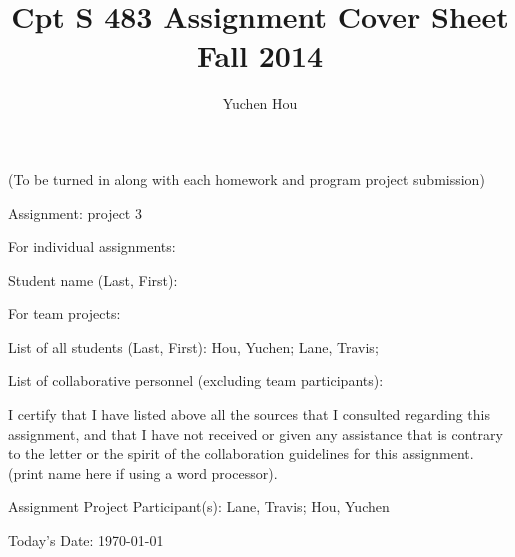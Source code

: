\documentclass[12pt]{article}
\begin{document}
\title{Cpt S 483 Assignment Cover Sheet \\ Fall 2014}
\author{Yuchen Hou}
\maketitle

(To be turned in along with each homework and program project submission)

Assignment: project 3

For individual assignments:

Student name (Last, First):

For team projects:

List of all students (Last, First): Hou, Yuchen; Lane, Travis;

List of collaborative personnel (excluding team participants):

I certify that I have listed above all the sources that I consulted regarding this assignment, and that I have not received or given any assistance that is contrary to the letter or the spirit of the collaboration guidelines for this assignment. (print name here if using a word processor).

Assignment Project Participant(s): Lane, Travis; Hou, Yuchen

Today's Date: \today
\end{document}
